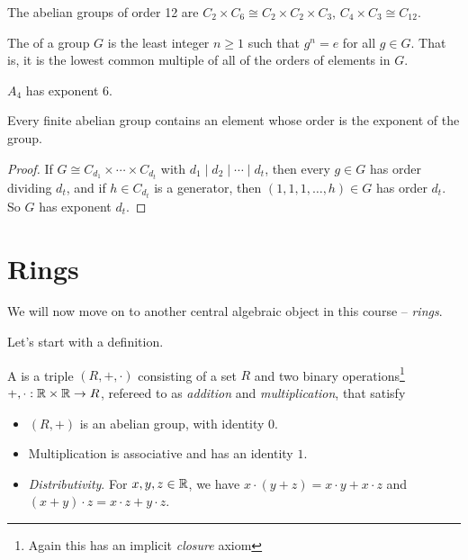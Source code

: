 \documentclass[a4paper]{scrreprt}
\begin{document}
\begin{example}
	The abelian groups of order 12 are $C_{2} \times C_6 \cong C_2 \times C_2 \times C_3$, $C_4 \times C_3 \cong C_{12}$.
\end{example}

\begin{definition}[Exponent]
	The  of a group $G$ is the least integer $n \geq 1$ such that $g^n = e$ for all $g \in G$. That is, it is the lowest common multiple of all of the orders of elements in $G$.
\end{definition}

\begin{example}
	$A_4$ has exponent 6.
\end{example}

\begin{corollary}
	Every finite abelian group contains an element whose order is the exponent of the group.
\end{corollary}
\begin{proof}
	If $G \cong C_{d_1} \times \cdots \times C_{d_t}$ with $d_1 \mid d_2 \mid \cdots \mid d_t$, then every $g \in G$ has order dividing $d_t$, and if $h \in C_{d_t}$ is a generator, then $(1, 1, 1, \dots, h) \in G$ has order $d_t$. So $G$ has exponent $d_t$.
\end{proof}


\chapter{Rings} 


We will now move on to another central algebraic object in this course -- \emph{rings}.


Let's start with a definition.


\begin{definition}[Ring]
	A  is a triple $(R, +, \cdot)$ consisting of a set $R$ and two binary operations\footnote{Again this has an implicit \emph{closure} axiom} $+, \cdot: \mathbb{R} \times \mathbb{R} \rightarrow R$, refereed to as \emph{addition} and \emph{multiplication}, that satisfy
	\begin{itemize}
		\item $(R, +)$ is an abelian group, with identity $0$.
		\item Multiplication is associative and has an identity $1$.
		\item \emph{Distributivity}. For $x, y, z \in \mathbb{R}$, we have $x \cdot (y + z) = x \cdot y + x \cdot z$ and $(x + y)\cdot z = x \cdot z + y \cdot z$.
	\end{itemize}
\end{definition}
\end{document}
